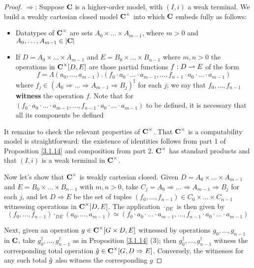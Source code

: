 \documentclass[11pt]{article}
\begin{document}
\begin{proof}
\(\Rightarrow\): Suppose \(\operatorname{\textbf{C}}\) is a higher-order model, with \((I,i)\) a weak terminal. We build a weakly
cartesian closed model \(\operatorname{\textbf{C}}^\times\) into which \(\operatorname{\textbf{C}}\) embeds fully as follows:
\begin{itemize}
\item Datatypes of \(\operatorname{\textbf{C}}^\times\) are sets \(A_0\times\dots\times A_{m-1}\), where \(m>0\) and \(A_0,\dots,A_{m-1}\in\abs{\bC}\)
\item If \(D=A_0\times\dots\times A_{m-1}\) and \(E=B_0\times\dots\times B_{n-1}\) where \(m,n>0\) the operations
in \(\operatorname{\textbf{C}}^\times[D,E]\) are those partial functions \(f:D\rightharpoonup E\) of the form
\begin{equation*}
f=\Lambda(a_0,\dots,a_{m-1}).(f_0\cdot a_0\cdot\dots\cdot a_{m-1},\dots,f_{n-1}\cdot a_0\cdot\dots\cdot a_{m-1})
\end{equation*}
where \(f_j\in(A_0\Rightarrow\dots\Rightarrow A_{m-1}\Rightarrow B_j)^\sharp\) for each \(j\); we say that \(f_0,\dots,f_{n-1}\) \textbf{witness}
the operation \(f\). Note that for \((f_0\cdot a_0\cdot\dots\cdot a_{m-1},\dots,f_{n-1}\cdot a_0\cdot\dots\cdot a_{m-1})\) to be
defined, it is necessary that all its components be defined
\end{itemize}


It remains to check the relevant properties of \(\operatorname{\textbf{C}}^\times\). That \(\operatorname{\textbf{C}}^\times\) is a computability model is
straightforward: the existence of identities follows from part 1 of Proposition \ref{3.1.14}
and composition from part 2. \(\operatorname{\textbf{C}}^\times\) has standard products and that \((I,i)\) is a weak terminal
in \(\operatorname{\textbf{C}}^\times\).

Now let's show that \(\operatorname{\textbf{C}}^\times\) is weakly cartesian closed. Given \(D=A_0\times\dots\times A_{m-1}\)
and \(E=B_0\times\dots\times B_{n-1}\) with \(m,n>0\), take \(C_j=A_0\Rightarrow\dots\Rightarrow A_{m-1}\Rightarrow B_j\) for each \(j\), and
let \(D\Rightarrow E\) be the set of tuples \((f_0,\dots,f_{n-1})\in C_0\times\dots\times C_{n-1}\) witnessing operations
in \(\operatorname{\textbf{C}}^\times[D,E]\). The application \(\cdot_{DE}\) is then given by
\begin{equation*}
(f_0,\dots,f_{n-1})\cdot_{DE}(a_0,\dots,a_{m-1})\simeq(f_0\cdot a_0\cdot\dots\cdot a_{m-1},\dots,f_{n-1}\cdot a_0\cdot\dots\cdot a_{m-1})
\end{equation*}

Next, given an operation \(g\in\operatorname{\textbf{C}}^\times[G\times D,E]\) witnessed by operations \(g_0,\dots,g_{n-1}\) in \(\operatorname{\textbf{C}}\),
take \(g_0^\dagger,\dots,g_{n-1}^\dagger\) as in Proposition \ref{3.1.14} (3); then \(g_0^\dagger,\dots,g_{n-1}^\dagger\) witness
the corresponding total operation \(\hat{g}\in\operatorname{\textbf{C}}^\times[G,D\Rightarrow E]\). Conversely, the witnesses for any such
total \(\hat{g}\) also witness the corresponding \(g\)
\end{proof}
\end{document}
